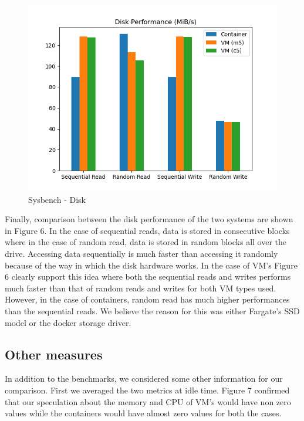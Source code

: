\documentclass[11pt]{article}
\begin{document}
\begin{figure}[H]
\centering
  \includegraphics[width=0.55\linewidth]{sysbench_disk.png}
  \caption{Sysbench - Disk}
  \label{fig:disk}
\end{figure}

Finally, comparison between the disk performance of the two systems are shown in Figure 6. In the case of sequential reads, data is stored in consecutive blocks where in the case of random read, data is stored in random blocks all over the drive.  Accessing data sequentially is much faster than accessing it randomly because of the way in which the disk hardware works. In the case of VM's Figure 6 clearly support this idea where both the sequential reads and writes performs much faster than that of random reads and writes for both VM types used. However, in the case of containers, random read has much higher performances than the sequential reads. We believe the reason for this was either Fargate's SSD model or the docker storage driver.


\subsection{Other measures}

In addition to the benchmarks, we considered some other information for our comparison. First we averaged the two metrics at idle time. Figure 7 confirmed that our speculation about the memory and CPU of VM's would have non zero values while the containers would have almost zero values for both the cases.   
\end{document}
